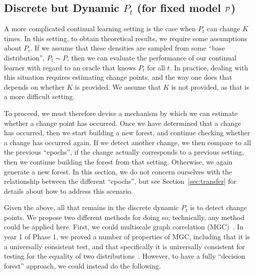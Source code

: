 \documentclass{article}
\begin{document}
\subsection{Discrete but Dynamic $P_t$ (for fixed model $\mathcal{P}$)}
\label{sec:jumps}

A more complicated continual learning setting is the case when $P_t$ can change $K$ times.  In this setting, to obtain theoretical results, we require some assumptions about $P_t$.  If we assume that these densities are sampled from some ``base distribution'', $P_t \sim P$, then we can evaluate the performance of our continual learner with regard to an oracle that knows $P_t$ for all $t$. In practice, dealing with this situation requires estimating change points, and the way one does that depends on whether $K$ is provided.  We assume that $K$ is not provided, as that is a more difficult setting.  

To proceed, we must therefore devise a mechanism by which we can estimate whether a change point has occurred. Once we have determined that a change has occurred, then we start building a new forest, and continue checking whether a change has occurred again.  If we detect another change, we then compare to all the previous ``epochs'', if the change actually corresponds to a previous setting, then we continue building the forest from that setting.  Otherwise, we again generate a new forest. In this section, we do not concern ourselves with the relationship between the different ``epochs'', but see Section~\ref{sec:transfer} for details about how to address this scenario.   

Given the above, all that remains in the discrete dynamic $P_t$ is to detect change points. We propose two different methods for doing so; technically, any method could be applied here. First, we could multiscale graph correlation (MGC)~\cite{mgc1, mgc2}.  In year 1 of Phase 1, we proved a number of properties of MGC, including that it is a universally consistent test, and that specifically it is universally consistent for testing for the equality of two distributions~\cite{exact}.  However, to have a fully ``decision forest'' approach, we could instead do the following. 
\end{document}
